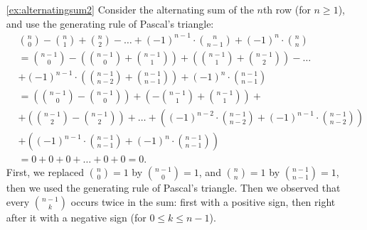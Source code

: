 \begin{enumerate}
\item[\ref{ex:alternatingsum2}]
Consider the alternating sum of the $n$th row (for $n\geq 1$), 
and use the generating rule of Pascal's triangle: 
{\small
\begin{align*}
& \binom{n}{0} - \binom{n}{1} + \binom{n}{2} - \dots + (-1)^{n-1} \cdot \binom{n}{n-1} + (-1)^{n} \cdot \binom{n}{n} \\
&= \binom{n-1}{0} - \left( \binom{n-1}{0} + \binom{n-1}{1} \right) + \left( \binom{n-1}{1} + \binom{n-1}{2} \right)  - \dots \\
&+ %
(-1)^{n-1} \cdot \left( \binom{n-1}{n-2} + \binom{n-1}{n-1} \right) + (-1)^{n} \cdot \binom{n-1}{n-1} \\
&= \left( \binom{n-1}{0} - \binom{n-1}{0} \right) + \left( - \binom{n-1}{1} + \binom{n-1}{1} \right) + \\
&+\left( \binom{n-1}{2} - \binom{n-1}{2} \right) + \dots 
+ \left( \left( -1 \right)^{n-2} \cdot \binom{n-1}{n-2} + \left( -1 \right)^{n-1} \cdot \binom{n-1}{n-2} \right)  \\
&+ \left( \left( -1 \right)^{n-1} \cdot \binom{n-1}{n-1} + \left( -1 \right)^{n} \cdot \binom{n-1}{n-1} \right) \\
&= 0 + 0 + 0 + \dots + 0 + 0 = 0. 
\end{align*}}
First, we replaced $\binom{n}{0}=1$ by $\binom{n-1}{0}=1$, 
and $\binom{n}{n} = 1$ by $\binom{n-1}{n-1} = 1$, then we used the generating rule of Pascal's triangle. 
Then we observed that every $\binom{n-1}{k}$ occurs twice in the sum: first with a positive sign, then right after it with a negative sign 
(for $0\leq k\leq n-1$). 


\end{enumerate}
